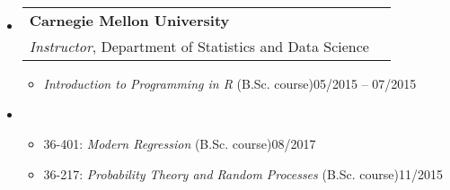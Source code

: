 \documentclass[letterpaper,10pt]{article}
\makeatletter
\newcommand{\subheadingtwolines}[4]{
\begin{tabular*}{6.55in}{l@{\cftdotfill{\cftsecdotsep}\extracolsep{\fill}}r}
#1 & #2 \\
#3 & #4 \\
\end{tabular*}}
\makeatother
\begin{document}
\vspace{-0.2cm}

\begin{itemize}[leftmargin=0.4cm]
\item[] \hspace{-2ex}\subheadingtwolines{\bf Carnegie Mellon University}{}{{\it Instructor}, Department of Statistics and Data Science}{}
\vspace{-0.3cm}

\begin{itemize}[leftmargin=0.4cm, rightmargin=0cm]
\item {\it Introduction to Programming in R} (B.Sc. course)\hfill 05/2015 -- 07/2015
\end{itemize}


\vspace{0.05cm}
\item[] 
\vspace{-0.075cm}
\begin{itemize}[leftmargin=0.4cm, rightmargin=0cm]
\item 36-401: \hspace{5.9ex}\emph{Modern Regression} (B.Sc. course)\hfill 08/2017
\item 36-217: \hspace{5.9ex}\emph{Probability Theory and Random Processes} (B.Sc. course)\hfill 11/2015
\end{itemize}

\vspace{0.1cm}


\end{itemize}
\end{document}
